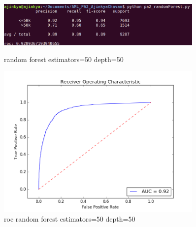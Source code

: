 \documentclass{article}
\begin{document}
\begin{figure}
    \centering
    \begin{minipage}{0.45\textwidth}
        \centering
        \includegraphics[width=0.9\textwidth]{random_50_50.png} %
        \caption{random forest estimators=50 depth=50}
    \end{minipage}\hfill
    \begin{minipage}{0.45\textwidth}
        \centering
        \includegraphics[width=0.9\textwidth]{roc_random_50_50.png} %
        \caption{roc random forest estimators=50 depth=50}
    \end{minipage}
\end{figure}
\end{document}
